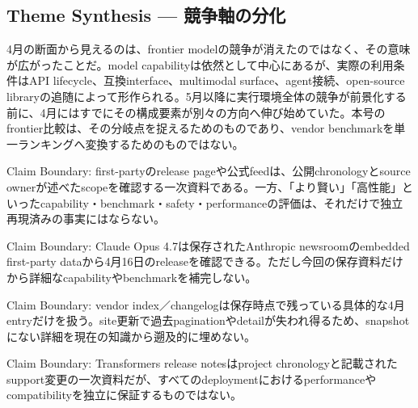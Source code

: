 \subsection{Theme Synthesis — 競争軸の分化}

4月の断面から見えるのは、frontier modelの競争が消えたのではなく、その意味が広がったことだ。model capabilityは依然として中心にあるが、実際の利用条件はAPI lifecycle、互換interface、multimodal surface、agent接続、open-source libraryの追随によって形作られる。5月以降に実行環境全体の競争が前景化する前に、4月にはすでにその構成要素が別々の方向へ伸び始めていた。本号のfrontier比較は、その分岐点を捉えるためのものであり、vendor benchmarkを単一ランキングへ変換するためのものではない。\autocite{src-6ddeedd7665f,src-9156c37fb1c2,src-a24fd97eb3d0,src-dfe7e0c6ff39,src-e547d0d8cbe3,src-eac8dfbeb78c}


\begin{claimboundary}
Claim Boundary: first-partyのrelease pageや公式feedは、公開chronologyとsource ownerが述べたscopeを確認する一次資料である。一方、「より賢い」「高性能」といったcapability・benchmark・safety・performanceの評価は、それだけで独立再現済みの事実にはならない。\autocite{src-a07eb39dec04,src-dfe7e0c6ff39}
\end{claimboundary}

\begin{claimboundary}
Claim Boundary: Claude Opus 4.7は保存されたAnthropic newsroomのembedded first-party dataから4月16日のreleaseを確認できる。ただし今回の保存資料だけから詳細なcapabilityやbenchmarkを補完しない。\autocite{src-f6aa679babd7}
\end{claimboundary}

\begin{claimboundary}
Claim Boundary: vendor index／changelogは保存時点で残っている具体的な4月entryだけを扱う。site更新で過去paginationやdetailが失われ得るため、snapshotにない詳細を現在の知識から遡及的に埋めない。\autocite{src-9156c37fb1c2,src-a24fd97eb3d0,src-e547d0d8cbe3,src-eac8dfbeb78c}
\end{claimboundary}

\begin{claimboundary}
Claim Boundary: Transformers release notesはproject chronologyと記載されたsupport変更の一次資料だが、すべてのdeploymentにおけるperformanceやcompatibilityを独立に保証するものではない。\autocite{src-6ddeedd7665f}
\end{claimboundary}
